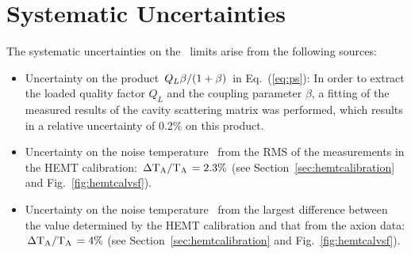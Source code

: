 \section{Systematic Uncertainties}
The systematic uncertainties on the \gagg\ limits arise from the 
following sources:
\begin{itemize}
\item Uncertainty on the product 
$\left.Q_L\beta\middle/\left(1+\beta\right)\right.$ in Eq.~(\ref{eq:ps}): 
In order to extract the loaded quality factor $Q_L$ and the coupling parameter 
$\beta$, a fitting of the measured results of the cavity scattering matrix 
was performed, which results in a relative uncertainty of 0.2\% on this 
product. 

\item Uncertainty on the noise temperature \ta\ from the RMS of 
the measurements in the HEMT calibration: 
$\left. \Delta \text{T}_\text{A}\middle/\text{T}_\text{A}\right.= 2.3\%$ 
(see Section~\ref{sec:hemtcalibration} and Fig.~\ref{fig:hemtcalvsf}).

\item Uncertainty on the noise temperature \ta\ from the largest difference 
between the value determined by the HEMT calibration and that from the axion 
data: $\left. \Delta \text{T}_\text{A}\middle/\text{T}_\text{A}\right.= 4\%$ 
(see Section~\ref{sec:hemtcalibration} and Fig.~\ref{fig:hemtcalvsf}). 


\end{itemize}
